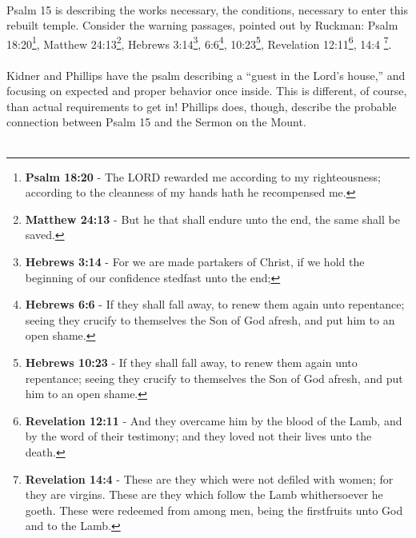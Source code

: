 \\
Psalm 15 is describing the works necessary, the conditions, necessary to enter this rebuilt temple. Consider the warning passages, pointed out by Ruckman: Psalm 18:20\footnote{\textbf{Psalm 18:20} - The LORD rewarded me according to my righteousness; according to the cleanness of my hands hath he recompensed me.}, Matthew 24:13\footnote{\textbf{Matthew 24:13} - \textcolor[cmyk]{0,1,0,0}{But he that shall endure unto the end, the same shall be saved.}}, Hebrews 3:14\footnote{\textbf{Hebrews 3:14} - For we are made partakers of Christ, if we hold the beginning of our confidence stedfast unto the end;}, 6:6\footnote{\textbf{Hebrews 6:6} -  If they shall fall away, to renew them again unto repentance; seeing they crucify to themselves the Son of God afresh, and put him to an open shame.}, 10:23\footnote{\textbf{Hebrews 10:23} -  If they shall fall away, to renew them again unto repentance; seeing they crucify to themselves the Son of God afresh, and put him to an open shame.}, Revelation 12:11\footnote{\textbf{Revelation 12:11} - And they overcame him by the blood of the Lamb, and by the word of their testimony; and they loved not their lives unto the death.}, 14:4 \footnote{\textbf{Revelation 14:4} - These are they which were not defiled with women; for they are virgins. These are they which follow the Lamb whithersoever he goeth. These were redeemed from among men, being the firstfruits unto God and to the Lamb.}. \cite{Ruckman1992PsalmsV1} \\
\\
Kidner\cite{kidner2014psalmsV1} and Phillips have the psalm describing a ``guest in the Lord's house,'' and focusing on expected and proper behavior once inside. This is different, of course, than actual requirements to get in! Phillips does, though, describe the probable connection between Psalm 15 and the Sermon on the Mount.  \cite[121]{Phillips2001ExploringPsalms1}\\
\\
